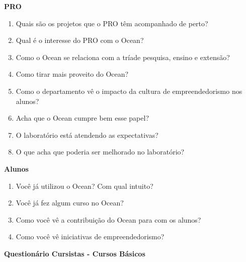 \begin{apendicesenv}
\clearpage

\textbf{PRO}

\begin{enumerate}
\item Quais são os projetos que o PRO têm acompanhado de perto?
\item Qual é o interesse do PRO com o Ocean?
\item Como o Ocean se relaciona com a tríade pesquisa, ensino e extensão?
\item Como tirar mais proveito do Ocean?
\item Como o departamento vê o impacto da cultura de empreendedorismo nos alunos?
\item Acha que o Ocean cumpre bem esse papel?
\item O laboratório está atendendo as expectativas?
\item O que acha que poderia ser melhorado no laboratório?
\end{enumerate}

\clearpage

\textbf{Alunos}

\begin{enumerate}
\item Você já utilizou o Ocean? Com qual intuito?
\item Você já fez algum curso no Ocean?
\item Como você vê a contribuição do Ocean para com os alunos?
\item Como você vê iniciativas de empreendedorismo?
\end{enumerate}

\clearpage

\textbf{Questionário Cursistas - Cursos Básicos}


\end{apendicesenv}
